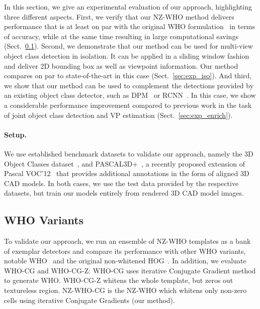 %
In this section, we give an experimental evaluation of our approach,
highlighting three different aspects.
%
First, we verify that our NZ-WHO method delivers performance that is
at least on par with the original WHO formulation~\cite{Hariharan12} in terms of
accuracy, while at the same time resulting in large computational
savings (Sect.~\ref{sec:variations}).
%
Second, we demonstrate that our method can be used for multi-view
object class detection in isolation. It can be applied in a sliding
window fashion and deliver 2D bounding box as well as viewpoint
information. Our method compares on par to state-of-the-art in this
case (Sect.~\ref{sec:exp_iso}).
%
And third, we show that our method can be used to complement the
detections provided by an existing object class detector, such
as DPM~\cite{Felzenszwalb10} or RCNN~\cite{Girshick14}. In this case,
we show a considerable performance improvement compared to previous
work in the task of joint object class detection and VP
estimation (Sect.~\ref{sec:exp_enrich}).

\paragraph{Setup.}
We use established benchmark datasets to validate our approach, namely
the 3D Object Classes dataset~\cite{Savarese07}, and
PASCAL3D+~\cite{Xiang14}, a recently proposed extension of Pascal
VOC'12~\cite{pascal12} that provides additional annotations in the
form of aligned 3D CAD models. In both cases, we use the test data
provided by the respective datasets, but train our models entirely
from rendered 3D CAD model images.

%

\subsection{WHO Variants}
\label{sec:variations}
To validate our approach, we run an ensemble of NZ-WHO templates as a
bank of exemplar detectors and compare its performance with other WHO
variants, notable WHO~\cite{Hariharan12} and the original non-whitened
HOG~\cite{Dalal05}. In addition, we evaluate WHO-CG and WHO-CG-Z:
WHO-CG uses iterative Conjugate Gradient method to generate
WHO. WHO-CG-Z whitens the whole template, but zeros out textureless
region. NZ-WHO-CG is the NZ-WHO which whitens only non-zero cells using
iterative Conjugate Gradients  (our method).

